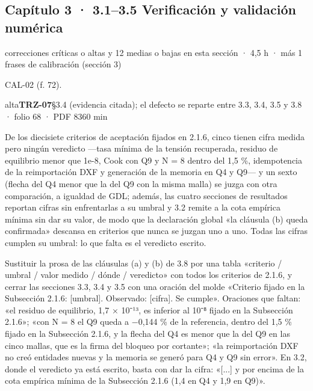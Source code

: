 \subsection{Capítulo 3 · 3.1–3.5 Verificación y validación numérica}
{\small\color{gris} correcciones críticas o altas y 12 medias o bajas en esta sección · 4,5 h · más 1 frases de calibración (sección 3)}\par
{\small{}CAL-02 (f. 72).\par}
\begin{ficha}{alta}{\casilla\textbf{TRZ-07}\quad{}\quad §3.4 (evidencia citada); el defecto se reparte entre 3.3, 3.4, 3.5 y 3.8 · folio 68 · PDF 83\hfill 60 min}
\par
{}De los diecisiete criterios de aceptación fijados en 2.1.6, cinco tienen cifra medida pero ningún veredicto —tasa mínima de la tensión recuperada, residuo de equilibrio menor que 1e-8, Cook con Q9 y N = 8 dentro del 1,5 \%, idempotencia de la reimportación DXF y generación de la memoria en Q4 y Q9— y un sexto (flecha del Q4 menor que la del Q9 con la misma malla) se juzga con otra comparación, a igualdad de GDL; además, las cuatro secciones de resultados reportan cifras sin enfrentarlas a su umbral y 3.2 remite a la cota empírica mínima sin dar su valor, de modo que la declaración global «la cláusula (b) queda confirmada» descansa en criterios que nunca se juzgan uno a uno. Todas las cifras cumplen su umbral: lo que falta es el veredicto escrito.\par
{}Sustituir la prosa de las cláusulas (a) y (b) de 3.8 por una tabla «criterio /\allowbreak{} umbral /\allowbreak{} valor medido /\allowbreak{} dónde /\allowbreak{} veredicto» con todos los criterios de 2.1.6, y cerrar las secciones 3.3, 3.4 y 3.5 con una oración del molde «Criterio fijado en la Subsección 2.1.6: [umbral]\allowbreak{}. Observado: [cifra]\allowbreak{}. Se cumple». Oraciones que faltan: «el residuo de equilibrio, 1,7 × 10{\mates ⁻}¹³, es inferior al 10{\mates ⁻}{\mates ⁸} fijado en la Subsección 2.1.6»; «con N = 8 el Q9 queda a {\mates −}0,144 \% de la referencia, dentro del 1,5 \% fijado en la Subsección 2.1.6, y la flecha del Q4 es menor que la del Q9 en las cinco mallas, que es la firma del bloqueo por cortante»; «la reimportación DXF no creó entidades nuevas y la memoria se generó para Q4 y Q9 sin error». En 3.2, donde el veredicto ya está escrito, basta con dar la cifra: «[...]\allowbreak{} y por encima de la cota empírica mínima de la Subsección 2.1.6 (1,4 en Q4 y 1,9 en Q9)».\par

\end{ficha}
